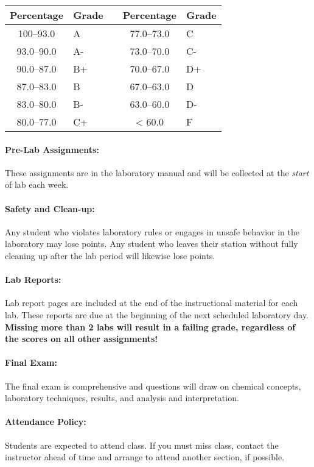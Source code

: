 \documentclass[12pt, letterpaper]{article}
\begin{document}
\begin{tabular}{cl|c|cl}
	Percentage & Grade &  & Percentage & Grade \\ \midrule
	100--93.0  & A     &  & 77.0--73.0 & C     \\
	93.0--90.0 & A-    &  & 73.0--70.0 & C-    \\
	90.0--87.0 & B+    &  & 70.0--67.0 & D+    \\
	87.0--83.0 & B     &  & 67.0--63.0 & D     \\
	83.0--80.0 & B-    &  & 63.0--60.0 & D-    \\
	80.0--77.0 & C+    &  & < 60.0     & F
\end{tabular}
\paragraph{Pre-Lab Assignments:}
These assignments are in the laboratory manual and will be collected at the \emph{start} of lab each week.

\paragraph{Safety and Clean-up:}
Any student who violates laboratory rules or engages in unsafe behavior in the laboratory may lose points. Any student who leaves their station without fully cleaning up after the lab period will likewise lose points.

\paragraph{Lab Reports:}
Lab report pages are included at the end of the instructional material for each lab. These reports are due at the beginning of the next scheduled laboratory day. {\bfseries Missing more than 2 labs will result in a failing grade, regardless of the scores on all other assignments!}

\paragraph{Final Exam:}
The final exam is comprehensive and questions will draw on chemical concepts, laboratory techniques, results, and analysis and interpretation.

\paragraph{Attendance Policy:}
Students are expected to attend class. If you must miss class, contact the instructor ahead of time and arrange to attend another section, if possible.
\end{document}
